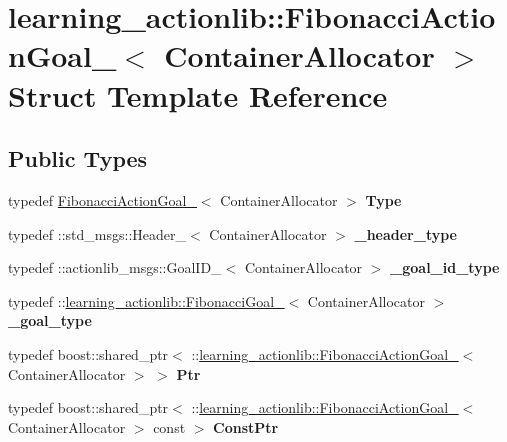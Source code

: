 \hypertarget{structlearning__actionlib_1_1FibonacciActionGoal__}{}\section{learning\+\_\+actionlib\+:\+:Fibonacci\+Action\+Goal\+\_\+$<$ Container\+Allocator $>$ Struct Template Reference}
\label{structlearning__actionlib_1_1FibonacciActionGoal__}
\subsection*{Public Types}
\begin{DoxyCompactItemize}
\item 
\mbox{\label{structlearning__actionlib_1_1FibonacciActionGoal___a6d38663bba50157302b6a92e3cd00581}} 
typedef \hyperlink{structlearning__actionlib_1_1FibonacciActionGoal__}{Fibonacci\+Action\+Goal\+\_\+}$<$ Container\+Allocator $>$ {\bfseries Type}
\item 
\mbox{\label{structlearning__actionlib_1_1FibonacciActionGoal___a1ca281538e66acc981db0c181bd569e4}} 
typedef \+::std\+\_\+msgs\+::\+Header\+\_\+$<$ Container\+Allocator $>$ {\bfseries \+\_\+header\+\_\+type}
\item 
\mbox{\label{structlearning__actionlib_1_1FibonacciActionGoal___a780a43b6c35440ba858d109346672901}} 
typedef \+::actionlib\+\_\+msgs\+::\+Goal\+I\+D\+\_\+$<$ Container\+Allocator $>$ {\bfseries \+\_\+goal\+\_\+id\+\_\+type}
\item 
\mbox{\label{structlearning__actionlib_1_1FibonacciActionGoal___af0695acace28493aa164ee544e882c96}} 
typedef \+::\hyperlink{structlearning__actionlib_1_1FibonacciGoal__}{learning\+\_\+actionlib\+::\+Fibonacci\+Goal\+\_\+}$<$ Container\+Allocator $>$ {\bfseries \+\_\+goal\+\_\+type}
\item 
\mbox{\label{structlearning__actionlib_1_1FibonacciActionGoal___ac002910ac031350018cd6a29df905093}} 
typedef boost\+::shared\+\_\+ptr$<$ \+::\hyperlink{structlearning__actionlib_1_1FibonacciActionGoal__}{learning\+\_\+actionlib\+::\+Fibonacci\+Action\+Goal\+\_\+}$<$ Container\+Allocator $>$ $>$ {\bfseries Ptr}
\item 
\mbox{\label{structlearning__actionlib_1_1FibonacciActionGoal___a5afa4b61d17306e3bd482866bbb09975}} 
typedef boost\+::shared\+\_\+ptr$<$ \+::\hyperlink{structlearning__actionlib_1_1FibonacciActionGoal__}{learning\+\_\+actionlib\+::\+Fibonacci\+Action\+Goal\+\_\+}$<$ Container\+Allocator $>$ const  $>$ {\bfseries Const\+Ptr}
\end{DoxyCompactItemize}
